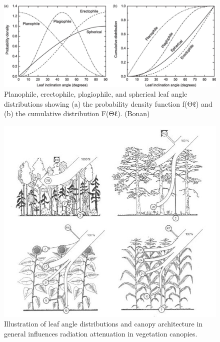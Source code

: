\documentclass[12pt,oneside]{book}
\begin{document}
\begin{figure}

{\centering \includegraphics[width=0.8\linewidth]{figures/chap3/f34_angle_distr} 

}

\caption{Planophile, erectophile, plagiophile, and spherical leaf angle distributions showing (a) the probability density function f(Θℓ) and (b) the cumulative distribution F(Θℓ). (Bonan)}\label{fig:f34}
\end{figure}

\begin{figure}

{\centering \includegraphics[width=0.8\linewidth]{figures/chap3/f35_architecture} 

}

\caption{Illustration of leaf angle distributions and canopy architecture in general influences radiation attenuation in vegetation canopies.}\label{fig:f35}
\end{figure}
\end{document}
